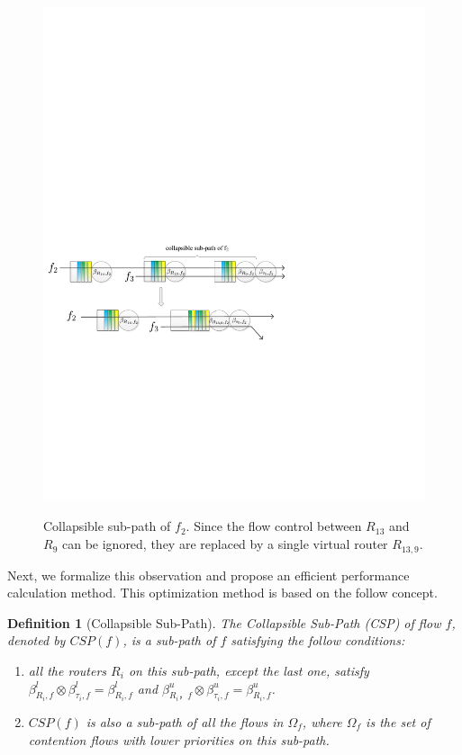 \documentclass[10pt,journal]{IEEEtran}
\newtheorem{definition}{Definition}
\begin{document}
\begin{figure}
  \centering
  \includegraphics[scale=0.5]{figures/collapse.pdf}\\
  \caption{Collapsible sub-path of $f_2$. Since the flow control between $R_{13}$ and $R_9$ can be ignored, they are replaced by a single virtual router $R_{13,9}$.}\label{collapse}
\end{figure}

Next, we formalize this observation and propose an efficient performance calculation method. This optimization method is based on the follow concept.
\begin{definition}[Collapsible Sub-Path]
The Collapsible Sub-Path (CSP) of flow $f$, denoted by $CSP(f)$, is a sub-path of $f$ satisfying the follow conditions:
\begin{enumerate}
  \item all the routers $R_i$ on this sub-path, except the last one, satisfy $\beta_{R_{i},f}^l\otimes\beta_{\tau_{i},f}^l=\beta_{R_{i},f}^l$ and $\beta_{R_{i}，f}^u\otimes\beta_{\tau_{i},f}^u=\beta_{R_{i},f}^u$.
  \item $CSP(f)$ is also a sub-path of all the flows in $\Omega_{f}$, where $\Omega_{f}$ is the set of contention flows with lower priorities on this sub-path.
\end{enumerate}
\end{definition}
\end{document}
